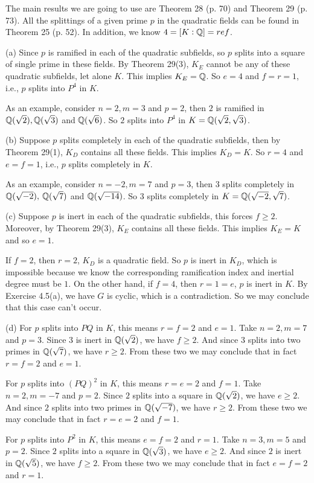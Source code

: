 \documentclass[../Marcus.tex]{subfiles}
\begin{document}
The main results we are going to use are Theorem 28 (p. 70) and Theorem 29 (p. 73). All the splittings of a given prime $p$ in the quadratic fields can be found in Theorem 25 (p. 52). In addition, we know $4=[K:\mathbb{Q}]=ref$.

(a) Since $p$ is ramified in each of the quadratic subfields, so $p$ splits into a square of single prime in these fields. By Theorem 29(3), $K_E$ cannot be any of these quadratic subfields, let alone $K$. This implies $K_E=\mathbb{Q}$. So $e=4$ and $f=r=1$, i.e., $p$ splits into $P^4$ in $K$.

As an example, consider $n=2,m=3$ and $p=2$, then $2$ is ramified in $\mathbb{Q}(\sqrt{2}),\mathbb{Q}(\sqrt{3})$ and $\mathbb{Q}(\sqrt{6})$. So $2$ splits into $P^4$ in $K=\mathbb{Q}(\sqrt{2},\sqrt{3})$.

(b) Suppose $p$ splits completely in each of the quadratic subfields, then by Theorem 29(1), $K_D$ contains all these fields. This implies $K_D=K$. So $r=4$ and $e=f=1$, i.e., $p$ splits completely in $K$.

As an example, consider $n=-2,m=7$ and $p=3$, then $3$ splits completely in $\mathbb{Q}(\sqrt{-2}),$ $\mathbb{Q}(\sqrt{7})$ and $\mathbb{Q}(\sqrt{-14})$. So $3$ splits completely in $K=\mathbb{Q}(\sqrt{-2},\sqrt{7})$.

(c) Suppose $p$ is inert in each of the quadratic subfields, this forces $f\geq 2$. Moreover, by Theorem 29(3), $K_E$ contains all these fields. This implies $K_E=K$ and so $e=1$.

If $f=2$, then $r=2$, $K_D$ is a quadratic field. So $p$ is inert in $K_D$, which is impossible because we know the corresponding ramification index and inertial degree must be $1$. On the other hand, if $f=4$, then $r=1=e$, $p$ is inert in $K$. By Exercise 4.5(a), we have $G$ is cyclic, which is a contradiction. So we may conclude that this case can't occur.

(d) For $p$ splits into $PQ$ in $K$, this means $r=f=2$ and $e=1$. Take $n=2,m=7$ and $p=3$. Since $3$ is inert in $\mathbb{Q}(\sqrt{2})$, we have $f\geq 2$. And since $3$ splits into two primes in $\mathbb{Q}(\sqrt{7})$, we have $r\geq 2$. From these two we may conclude that in fact $r=f=2$ and $e=1$.

For $p$ splits into $(PQ)^2$ in $K$, this means $r=e=2$ and $f=1$. Take $n=2,m=-7$ and $p=2$. Since $2$ splits into a square in $\mathbb{Q}(\sqrt{2})$, we have $e\geq 2$. And since $2$ splits into two primes in $\mathbb{Q}(\sqrt{-7})$, we have $r\geq 2$. From these two we may conclude that in fact $r=e=2$ and $f=1$.

For $p$ splits into $P^2$ in $K$, this means $e=f=2$ and $r=1$. Take $n=3,m=5$ and $p=2$. Since $2$ splits into a square in $\mathbb{Q}(\sqrt{3})$, we have $e\geq 2$. And since $2$ is inert in $\mathbb{Q}(\sqrt{5})$, we have $f\geq 2$. From these two we may conclude that in fact $e=f=2$ and $r=1$.
\end{document}
